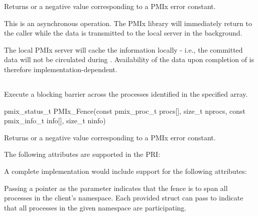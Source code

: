 Returns  or a negative value corresponding to a PMIx error constant.

\descr

This is an asynchronous operation.
The PMIx library will immediately return to the caller while the data is transmitted to the local server in the background.

\adviceuserstart
The local PMIx server will cache the information locally - i.e., the committed data will not be circulated during .
Availability of the data upon completion of  is therefore implementation-dependent.
\adviceuserend


\subsection{}

\summary

Execute a blocking barrier across the processes identified in the specified array.

\format

\cspecificstart
\begin{codepar}
pmix_status_t
PMIx_Fence(const pmix_proc_t procs[], size_t nprocs,
           const pmix_info_t info[], size_t ninfo)
\end{codepar}
\cspecificend

\begin{arglist}
\end{arglist}

Returns  or a negative value corresponding to a PMIx error constant.

\priattr
The following attributes are supported in the \ac{PRI}:


\optattr
A complete implementation would include support for the following attributes:


\descr

Passing a  pointer as the  parameter indicates that the fence is to span all processes in the client's namespace.
Each provided  struct can pass  to indicate that all processes in the given namespace are participating.

